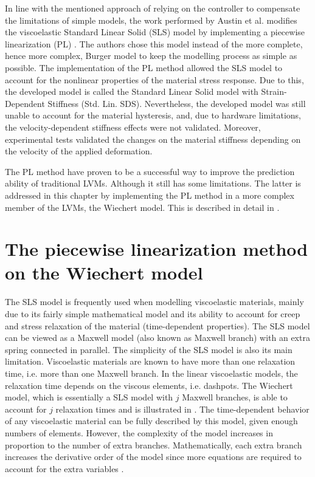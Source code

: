 In line with the mentioned approach of relying on the controller to compensate the limitations of simple models, the work performed by Austin et al. modifies the viscoelastic Standard Linear Solid (SLS) model by implementing a piecewise linearization (PL) \cite{austin2015control}. The authors chose this model instead of the more complete, hence more complex, Burger model to keep the modelling process as simple as possible. The implementation of the PL method allowed the SLS model to account for the nonlinear properties of the material stress response. Due to this, the developed model is called the Standard Linear Solid model with Strain-Dependent Stiffness (Std. Lin. SDS). Nevertheless, the developed model was still unable to account for the material hysteresis, and, due to hardware limitations, the velocity-dependent stiffness effects were not validated. Moreover, experimental tests validated the changes on the material stiffness depending on the velocity of the applied deformation.

The PL method have proven to be a successful way to improve the prediction ability of traditional LVMs. Although it still has some limitations. The latter is addressed in this chapter by implementing the PL method in a more complex member of the LVMs, the Wiechert model. This is described in detail in .

\section{The piecewise linearization method on the Wiechert model} \label{sec:wiechert}

The SLS model is frequently used when modelling viscoelastic materials, mainly due to its fairly simple mathematical model and its ability to account for creep and stress relaxation of the material (time-dependent properties). The SLS model can be viewed as a Maxwell model (also known as Maxwell branch) with an extra spring connected in parallel. The simplicity of the SLS model is also its main limitation. 
Viscoelastic materials are known to have more than one relaxation time, i.e. more than one Maxwell branch. In the linear viscoelastic models, the relaxation time depends on the viscous elements, i.e. dashpots. The Wiechert model, which is essentially a SLS model with $j$ Maxwell branches, is able to account for $j$ relaxation times and is illustrated in . The time-dependent behavior of any viscoelastic material can be fully described by this model, given enough numbers of elements. However, the complexity of the model increases in proportion to the number of extra branches. Mathematically, each extra branch increases the derivative order of the model since more equations are required to account for the extra variables \cite{tirella2014strain,roylance2001engineering}.

